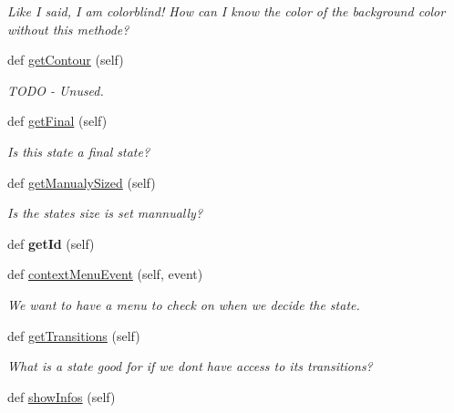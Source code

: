 \begin{DoxyCompactItemize}
\begin{DoxyCompactList}\small\item\em Like I said, I am colorblind! How can I know the color of the background color without this methode? \end{DoxyCompactList}\item 
def \mbox{\hyperlink{classState_1_1State_afa4bdf4fa0cb0c9644bf5b2777ebc876}{get\+Contour}} (self)
\begin{DoxyCompactList}\small\item\em T\+O\+DO -\/ Unused. \end{DoxyCompactList}\item 
def \mbox{\hyperlink{classState_1_1State_af3be869fa4fa723d022ce8df0c48dec6}{get\+Final}} (self)
\begin{DoxyCompactList}\small\item\em Is this state a final state? \end{DoxyCompactList}\item 
def \mbox{\hyperlink{classState_1_1State_a7d796ed9f41f65938e2aaa1e47fefb63}{get\+Manualy\+Sized}} (self)
\begin{DoxyCompactList}\small\item\em Is the state\textquotesingle{}s size is set mannually? \end{DoxyCompactList}\item 
\mbox{\label{classState_1_1State_a31ede47a6c4ffd0bd6ccbe3bcf570466}} 
def {\bfseries get\+Id} (self)
\item 
def \mbox{\hyperlink{classState_1_1State_aaa419198fa3621653b526f3dab2a9354}{context\+Menu\+Event}} (self, event)
\begin{DoxyCompactList}\small\item\em We want to have a menu to check on when we decide the state. \end{DoxyCompactList}\item 
def \mbox{\hyperlink{classState_1_1State_a1a7c4fbb0f8d3a14ef16726704d491be}{get\+Transitions}} (self)
\begin{DoxyCompactList}\small\item\em What is a state good for if we don\textquotesingle{}t have access to its transitions? \end{DoxyCompactList}\item 
\mbox{\label{classState_1_1State_a28e28e4e91577847b44c7324d5584ed7}} 
def \mbox{\hyperlink{classState_1_1State_a28e28e4e91577847b44c7324d5584ed7}{show\+Infos}} (self)

\end{DoxyCompactItemize}
